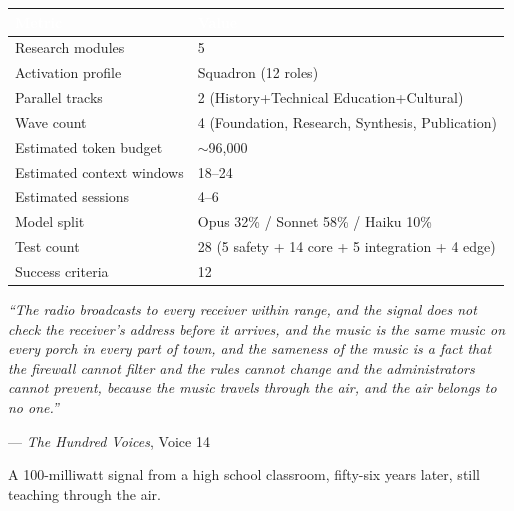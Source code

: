 \documentclass[11pt,letterpaper]{article}
\newcommand{\tableheader}[1]{\textbf{\sffamily\textcolor{white}{#1}}}
\begin{document}
\begin{center}
\begin{tabularx}{\textwidth}{L{5cm}X}
\toprule
{}
\tableheader{Metric} & \tableheader{Value} \\
\midrule
Research modules & 5 \\
Activation profile & Squadron (12 roles) \\
Parallel tracks & 2 (History+Technical \textbar{} Education+Cultural) \\
Wave count & 4 (Foundation, Research, Synthesis, Publication) \\
Estimated token budget & $\sim$96,000 \\
Estimated context windows & 18--24 \\
Estimated sessions & 4--6 \\
Model split & Opus 32\% / Sonnet 58\% / Haiku 10\% \\
Test count & 28 (5 safety + 14 core + 5 integration + 4 edge) \\
Success criteria & 12 \\
\bottomrule
\end{tabularx}
\end{center}

\vspace{1em}

\begin{quotebox}
\textit{``The radio broadcasts to every receiver within range, and the signal does not check the receiver's address before it arrives, and the music is the same music on every porch in every part of town, and the sameness of the music is a fact that the firewall cannot filter and the rules cannot change and the administrators cannot prevent, because the music travels through the air, and the air belongs to no one.''}

\vspace{0.5em}
\hfill --- \textit{The Hundred Voices}, Voice 14

\vspace{0.5em}
A 100-milliwatt signal from a high school classroom, fifty-six years later, still teaching through the air.
\end{quotebox}
\end{document}
